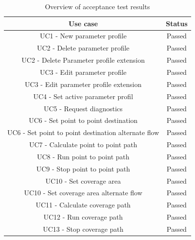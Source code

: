 \begin{table}[H]
\centering
\begin{tabular}{|c|c|}
\hline 
\textbf{Use case} & \textbf{Status}\\ 
\hline 
UC1 - New parameter profile & Passed \\ 
\hline 
UC2 - Delete parameter profile & Passed \\ 
\hline 
UC2 - Delete Parameter profile extension & Passed \\ 
\hline 
UC3 - Edit parameter profile & Passed \\ 
\hline 
UC3 - Edit parameter profile extension & Passed \\ 
\hline 
UC4 - Set active parameter profil & Passed \\ 
\hline 
UC5 - Request diagnostics & Passed \\ 
\hline 
UC6 - Set point to point destination & Passed \\ 
\hline 
UC6 - Set point to point destination alternate flow & Passed \\ 
\hline 
UC7 - Calculate point to point path & Passed \\ 
\hline 
UC8 - Run point to point path & Passed \\ 
\hline 
UC9 - Stop point to point path & Passed \\ 
\hline 
UC10 - Set coverage area & Passed \\ 
\hline 
UC10 - Set coverage area alternate flow & Passed \\ 
\hline 
UC11 - Calculate coverage path & Passed \\ 
\hline 
UC12 - Run coverage path & Passed \\ 
\hline 
UC13 - Stop coverage path & Passed \\ 
\hline 
\end{tabular} 
\caption{Overview of acceptance test results}
\label{table:acceptance_test_results}
\end{table}